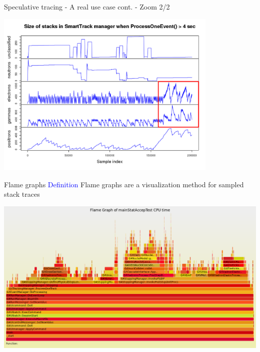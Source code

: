 \documentclass{beamer}
\begin{document}
\begin{frame}{Speculative tracing - A real use case cont. - Zoom 2/2}

\begin{center}
  \includegraphics[width=0.8\textwidth]{pathol-zoom2.png}
\end{center}
\end{frame}

\begin{frame}{Flame graphs}
\textcolor{blue}{Definition} Flame graphs are a visualization method for sampled stack traces

\begin{center}
  \includegraphics[width=1.0\textwidth]{timeflame.png}
\end{center}
\end{frame}
\end{document}
